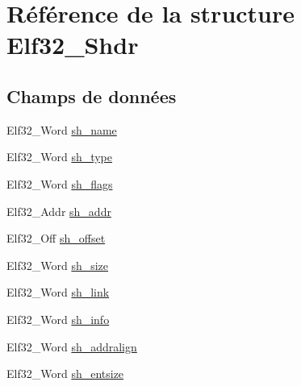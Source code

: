 \hypertarget{structElf32__Shdr}{\section{Référence de la structure Elf32\+\_\+\+Shdr}
\label{structElf32__Shdr}
}
\subsection*{Champs de données}
\begin{DoxyCompactItemize}
\item 
Elf32\+\_\+\+Word \hyperlink{structElf32__Shdr_a6e8fd300ca473a31d0f65817ce371dfd}{sh\+\_\+name}
\item 
Elf32\+\_\+\+Word \hyperlink{structElf32__Shdr_aab6c221dbd7e16987df41280fb915408}{sh\+\_\+type}
\item 
Elf32\+\_\+\+Word \hyperlink{structElf32__Shdr_a27e003d8da37de3038a0065577a7743d}{sh\+\_\+flags}
\item 
Elf32\+\_\+\+Addr \hyperlink{structElf32__Shdr_a7e668a62cee74a2f9c6edabb5f45635a}{sh\+\_\+addr}
\item 
Elf32\+\_\+\+Off \hyperlink{structElf32__Shdr_a6e37227a5777cddc0a9dbbb3c2598ec1}{sh\+\_\+offset}
\item 
Elf32\+\_\+\+Word \hyperlink{structElf32__Shdr_a84dc67bb0ab65880bbcd74fbee722ff1}{sh\+\_\+size}
\item 
Elf32\+\_\+\+Word \hyperlink{structElf32__Shdr_ad759308388eb14c5c6e4d636c38999da}{sh\+\_\+link}
\item 
Elf32\+\_\+\+Word \hyperlink{structElf32__Shdr_aef63fe62c2c9927f374c4f987954c6e5}{sh\+\_\+info}
\item 
Elf32\+\_\+\+Word \hyperlink{structElf32__Shdr_a399f50b3591e6286d4ad819f790979ed}{sh\+\_\+addralign}
\item 
Elf32\+\_\+\+Word \hyperlink{structElf32__Shdr_a10c59cecc928aae27930601fe545d3ca}{sh\+\_\+entsize}
\end{DoxyCompactItemize}


